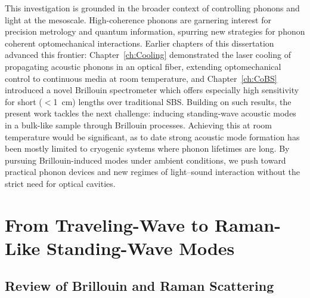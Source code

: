 This investigation is grounded in the broader context of controlling phonons and light at the mesoscale. High-coherence phonons are garnering interest for precision metrology and quantum information, \cite{balram2016coherent, schliesser2014cavity} spurring new strategies for phonon coherent optomechanical interactions. \cite{kippenberg2008cavity, aspelmeyer2014cavity} Earlier chapters of this dissertation advanced this frontier: Chapter~\ref{ch:Cooling} demonstrated the laser cooling of propagating acoustic phonons in an optical fiber, extending optomechanical control to continuous media at room temperature, \cite{johnson2023laser} and Chapter~\ref{ch:CoBS} introduced a novel Brillouin spectrometer which offers especially high sensitivity for short (\(<\)\SI{1}{\centi\meter}) lengths over traditional \ac{SBS}. Building on such results, the present work tackles the next challenge: inducing standing-wave acoustic modes in a bulk-like sample through Brillouin processes. Achieving this at room temperature would be significant, as to date strong acoustic mode formation has been mostly limited to cryogenic systems where phonon lifetimes are long. \cite{otterstrom2018optomechanical, galliou2013extremely} By pursuing Brillouin-induced modes under ambient conditions, we push toward practical phonon devices and new regimes of light–sound interaction without the strict need for optical cavities. \cite{pant2011chip}


\section{From Traveling-Wave to Raman-Like Standing-Wave Modes}
\label{sec:Raman:FromTraveling-WavetoRaman-LikeStanding-WaveModes}

\subsection{Review of Brillouin and Raman Scattering}
\label{subsec:Raman:ReviewofBrillouinandRamanScattering}

